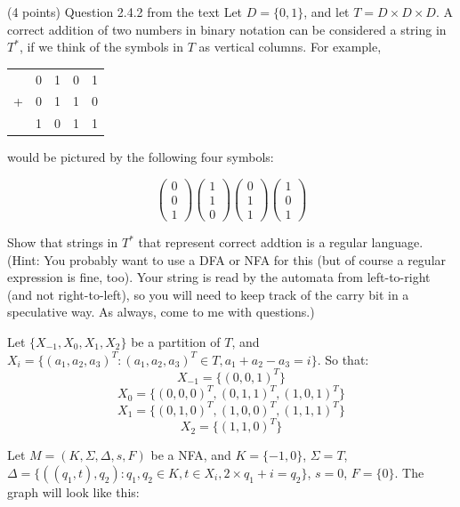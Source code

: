 \documentclass[paper=a4, fontsize=11pt]{scrartcl} %
\begin{document}
\begin{fancyquotes}
  (4 points) Question 2.4.2 from the text Let $D = \{0,1\}$, and let
  $T = D\times D\times D$. A correct addition of two numbers in binary
  notation can be considered a string in $T^*$, if we think of the
  symbols in $T$ as vertical columns. For example,

  \begin{center}
    \begin{tabular}[hp]{rrrrr}
      &0 &1 &0 &1\\
      + &0 &1 &1 &0\\
      \hline
      &1 &0 &1 &1\\
    \end{tabular}
  \end{center}

  would be pictured by the following four symbols:

  \[
  \begin{pmatrix}0\\0\\1\end{pmatrix}
  \begin{pmatrix}1\\1\\0\end{pmatrix}
  \begin{pmatrix}0\\1\\1\end{pmatrix}
  \begin{pmatrix}1\\0\\1\end{pmatrix}
  \]

  Show that strings in $T^*$ that represent correct addtion is a
  regular language. (Hint: You probably want to use a DFA or NFA for
  this (but of course a regular expression is fine, too). Your string
  is read by the automata from left-to-right (and not right-to-left),
  so you will need to keep track of the carry bit in a speculative
  way. As always, come to me with questions.)
\end{fancyquotes}

Let $\{X_{-1},X_0,X_1,X_2\}$ be a partition of $T$, and
$X_i = \{(a_1,a_2,a_3)^T: (a_1,a_2,a_3)^T\in T, a_1+a_2-a_3=i\}$.
So that:
\[X_{-1} = \{(0,0,1)^T\}\]
\[X_0 = \{(0,0,0)^T, (0,1,1)^T, (1,0,1)^T\}\]
\[X_1 = \{(0,1,0)^T, (1,0,0)^T, (1,1,1)^T\}\]
\[X_2 = \{(1,1,0)^T\}\]

Let $M = (K,\Sigma,\Delta,s,F)$ be a NFA, and $K = \{-1,0\}$, $\Sigma
= T $, $\Delta = \{((q_1,t),q_2): q_1,q_2\in K, t\in X_i, 2\times
q_1+i=q_2 \} $, $s = 0$, $F = \{0\}$.
The graph will look like this:
\end{document}
